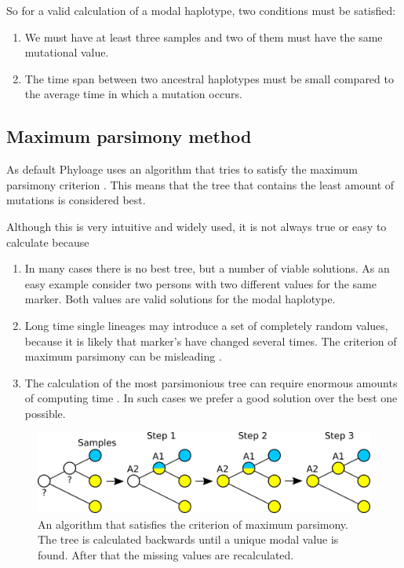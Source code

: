 So for a valid calculation of a modal haplotype, two
conditions must be satisfied:

\begin{enumerate}
\item We must have at least three samples and two of them must
	have the same mutational value.
\item The time span between two ancestral haplotypes must be
	small compared to the average time in which a mutation occurs.
\end{enumerate}


\subsection{Maximum parsimony method}

As default Phyloage uses an algorithm that tries to satisfy
the maximum parsimony criterion \cite{Wiki-Maximum_parsimony}.
This means that the tree that contains the least amount of
mutations is considered best.

Although this is very intuitive and widely used, it is not
always true or easy to calculate because

\begin{enumerate}
\item In many cases there is no best tree, but a number of
	viable solutions. As an easy example consider two persons
	with two different values for the same marker. Both values
	are valid solutions for the modal haplotype.
\item Long time single lineages may introduce a set of completely
	random values, because it is likely that marker's have changed
	several times. The criterion of maximum parsimony can be
	misleading \cite{Fels78}.
\item The calculation of the most parsimonious tree can require
	enormous amounts of computing time \cite{Wiki-Maximum_parsimony}.
	In such cases we prefer a good solution over the best one possible.
\end{enumerate}

\begin{figure}[ht]
\centering
\includegraphics[width=13cm]{img/parsimony.png}
\caption{\label{parsimony} An algorithm that satisfies the
criterion of maximum parsimony. The tree is calculated backwards
until a unique modal value is found. After that the missing
values are recalculated.}
\end{figure}

